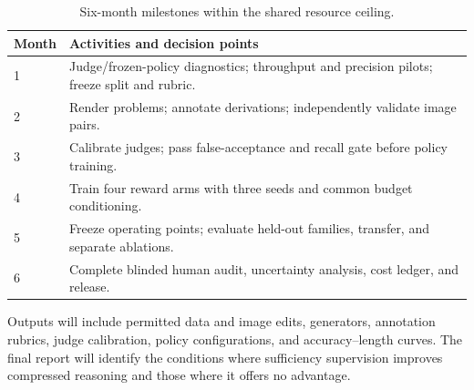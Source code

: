 \documentclass[11pt,letterpaper]{article}
\begin{document}
\begin{table}[ht]
\centering\small
\caption{Six-month milestones within the shared resource ceiling.}
\label{tab:timeline}
\begin{tabular}{@{}p{.08\linewidth}p{.84\linewidth}@{}}
\toprule
Month & Activities and decision points \\
\midrule
1 & Judge/frozen-policy diagnostics; throughput and precision pilots; freeze split and rubric. \\
2 & Render problems; annotate derivations; independently validate image pairs. \\
3 & Calibrate judges; pass false-acceptance and recall gate before policy training. \\
4 & Train four reward arms with three seeds and common budget conditioning. \\
5 & Freeze operating points; evaluate held-out families, transfer, and separate ablations. \\
6 & Complete blinded human audit, uncertainty analysis, cost ledger, and release. \\
\bottomrule
\end{tabular}
\end{table}

Outputs will include permitted data and image edits, generators, annotation rubrics, judge calibration, policy configurations, and accuracy--length curves. The final report will identify the conditions where sufficiency supervision improves compressed reasoning and those where it offers no advantage.
\end{document}
